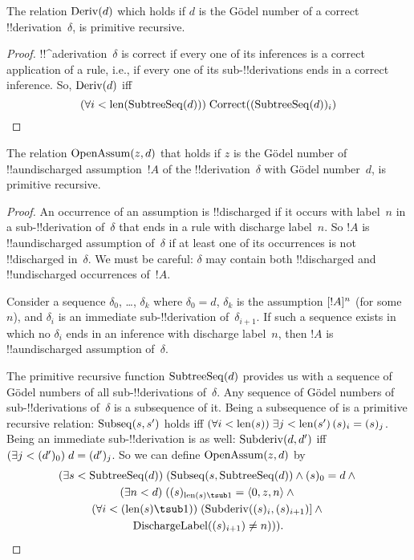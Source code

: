 \documentclass[../../../include/open-logic-section]{subfiles}
\begin{document}
\begin{prop}
  The relation $\mathrm{Deriv}(d)$ which holds if $d$ is the G\"odel
  number of a correct !!{derivation}~$\delta$, is primitive recursive.
\end{prop}

\begin{proof}
  !!^a{derivation}~$\delta$ is correct if every one of its inferences
  is a correct application of a rule, i.e., if every one of its
  sub-!!{derivation}s ends in a correct inference. So, $\mathrm{Deriv}(d)$
  iff
  \[
  (\forall i<\mathrm{len}(\mathrm{SubtreeSeq}(d)))\; \mathrm{Correct}((\mathrm{SubtreeSeq}(d))_i)
  \qedhere
  \]
\end{proof}

\begin{prop}
   The relation $\mathrm{OpenAssum}(z, d)$ that
  holds if $z$ is the G\"odel number of !!a{undischarged} assumption~$!A$
  of the !!{derivation}~$\delta$ with G\"odel number~$d$, is primitive
  recursive.
\end{prop}

\begin{proof}
  An occurrence of an assumption is !!{discharged} if it occurs with
  label~$n$ in a sub-!!{derivation} of~$\delta$ that ends in a rule
  with discharge label~$n$. So $!A$ is !!a{undischarged} assumption
  of~$\delta$ if at least one of its occurrences is not !!{discharged}
  in~$\delta$. We must be careful: $\delta$ may contain both
  !!{discharged} and !!{undischarged} occurrences of~$!A$.

  Consider a sequence $\delta_0$, \dots, $\delta_k$ where $\delta_0 =
  d$, $\delta_k$ is the assumption $[!A]^{n}$ (for some~$n$),
  and $\delta_{i}$ is an immediate sub-!!{derivation}
  of~$\delta_{i+1}$. If such a sequence exists in which no $\delta_i$
  ends in an inference with discharge label~$n$, then $!A$ is
  !!a{undischarged} assumption of~$\delta$.

  The primitive recursive function $\mathrm{SubtreeSeq}(d)$ provides us
  with a sequence of G\"odel numbers of all sub-!!{derivation}s
  of~$\delta$. Any sequence of G\"odel numbers of sub-!!{derivation}s
  of~$\delta$ is a subsequence of it. Being a subsequence of is a
  primitive recursive relation: $\mathrm{Subseq}(s, s')$ holds iff
  $\bforall{i<\len{s}}{\lexists[j<\len{s'}][(s)_i = (s)_j]}$. Being an
  immediate sub-!!{derivation} is as well: $\mathrm{Subderiv}(d, d')$ iff
  $(\exists j<(d')_0)\; d = (d')_j$. So we can define
  $\mathrm{OpenAssum}(z, d)$ by
  \begin{multline*}
    \bexists{s<\fn{SubtreeSeq}(d)}{(\fn{Subseq}(s, \fn{SubtreeSeq}(d))
      \land (s)_0 = d \land {}} \\
    \bexists{n<d}{((s)_{\len{s} \tsub 1} = \tuple{0, z, n} \land {}}\\
      \bforall{i<(\len{s} \tsub 1)}{(\fn{Subderiv}((s)_i, (s)_{i+1})] \land {}}\\
      \fn{DischargeLabel}((s)_{i+1}) \neq n))).\qedhere
  \end{multline*}
\end{proof}
\end{document}

